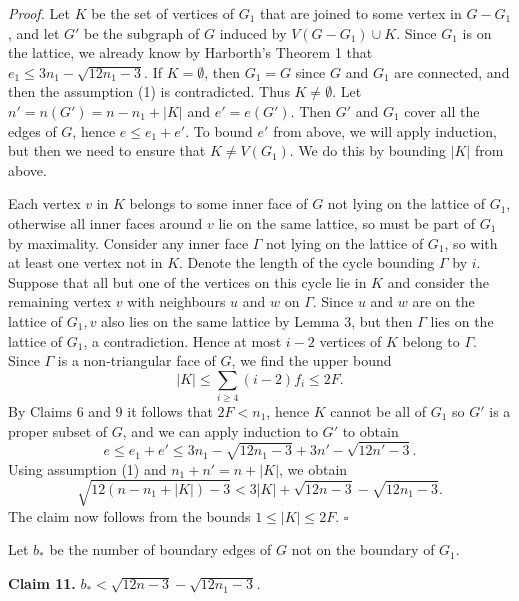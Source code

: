 \documentclass{article}
\begin{document}
\textit{Proof.} Let $K$ be the set of vertices of $G_{1}$ that are joined to some vertex in $G - G_{1}$, and let $G'$ be the subgraph of $G$ induced by $V (G - G_{1}) \cup K$. Since $G_{1}$ is on the lattice, we already know by Harborth’s Theorem 1 that $e_{1} \le 3n_{1} - \sqrt{12n_{1} - 3}$. If $K = \emptyset$, then $G_{1} = G$ since $G$ and $G_{1}$ are connected, and then the assumption (1) is contradicted. Thus $K \ne \emptyset$. Let $n' = n(G') = n - n_{1} + |K|$ and $e' = e(G')$. Then $G'$ and $G_{1}$ cover all the edges of $G$, hence $e \le e_{1} + e'$. To bound $e'$ from above, we will apply induction, but then we need to ensure that $K \ne V (G_{1})$. We do this by bounding $|K|$ from above.

Each vertex $v$ in $K$ belongs to some inner face of $G$ not lying on the lattice of $G_{1}$, otherwise all inner faces around $v$ lie on the same lattice, so must be part of $G_{1}$ by maximality. Consider any inner face $\Gamma$ not lying on the lattice of $G_{1}$, so with at least one vertex not in $K$. Denote the length of the cycle bounding $\Gamma$ by $i$. Suppose that all but one of the vertices on this cycle lie in $K$ and consider the remaining vertex $v$ with neighbours $u$ and $w$ on $\Gamma$. Since $u$ and $w$ are on the lattice of $G_{1}, v$ also lies on the same lattice by Lemma 3, but then $\Gamma$ lies on the lattice of $G_{1}$, a contradiction. Hence at most $i - 2$ vertices of $K$ belong to $\Gamma$. Since $\Gamma$ is a non-triangular face of $G$, we find the upper bound 
\begin{equation*}
|K| \le \sum_{i\ge 4}(i-2)f_i \le 2F.
\end{equation*} By Claims 6 and 9 it follows that $2F < n_{1}$, hence $K$ cannot be all of $G_{1}$ so $G'$ is a proper subset of $G$, and we can apply induction to $G'$ to obtain 
\begin{equation*}
e \le e_1 + e' \le 3n_1 - \sqrt{12n_1-3} + 3n' - \sqrt{12n'-3}.
\end{equation*} Using assumption (1) and $n_{1} + n' = n + |K|$, we obtain 
\begin{equation*}
\sqrt{12(n - n_1 + |K|) - 3} < 3|K| + \sqrt{12n-3} - \sqrt{12n_1-3}. \tag{9}
\end{equation*} The claim now follows from the bounds $1 \le |K| \le 2F$. \hfill$\square$

Let $b_{*}$ be the number of boundary edges of $G$ not on the boundary of $G_{1}$.

\textbf{Claim 11.} $b_{*} < \sqrt{12n - 3} - \sqrt{12n_{1} - 3}$\textit{.}
\end{document}

